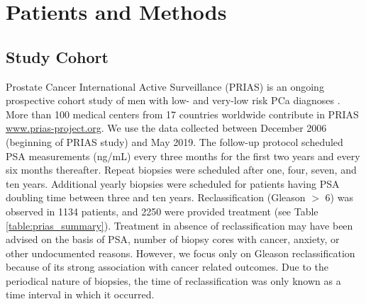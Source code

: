\section{Patients and Methods}

\subsection{Study Cohort}
Prostate Cancer International Active Surveillance (PRIAS) is an ongoing prospective cohort study of men with low- and very-low risk PCa diagnoses \cite{bul2013active}. More than 100 medical centers from 17 countries worldwide contribute in PRIAS \url{www.prias-project.org}. We use the data collected between December 2006 (beginning of PRIAS study) and May 2019. The follow-up protocol scheduled PSA measurements (ng/mL) every three months for the first two years and every six months thereafter. Repeat biopsies were scheduled after one, four, seven, and ten years. Additional yearly biopsies were scheduled for patients having PSA doubling time between three and ten years. Reclassification (Gleason $>$ 6) was observed in 1134 patients, and 2250 were provided treatment (see Table \ref{table:prias_summary}). Treatment in absence of reclassification may have been advised on the basis of PSA, number of biopsy cores with cancer, anxiety, or other undocumented reasons. However, we focus only on Gleason reclassification because of its strong association with cancer related outcomes. Due to the periodical nature of biopsies, the time of reclassification was only known as a time interval in which it occurred.

